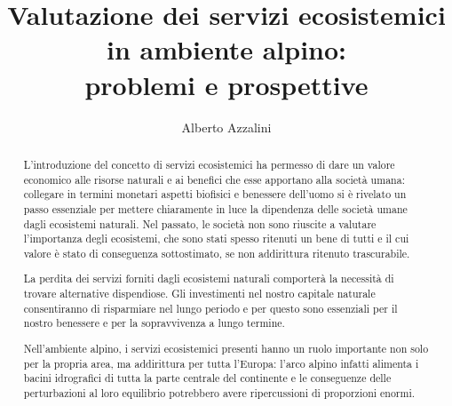 \documentclass[12pt,a4paper]{article}
\author{Alberto Azzalini}
\title{Valutazione dei servizi ecosistemici in ambiente alpino:\\ problemi e prospettive}
\begin{document}
	\maketitle
	\begin{abstract}
		L'introduzione del concetto di servizi ecosistemici \cite{MEA_EcosystemsAndHumanWellBeing:Synthesis} ha permesso di dare un valore economico alle risorse naturali e ai benefici che esse apportano alla società umana: collegare in termini monetari aspetti biofisici e benessere dell'uomo si è rivelato un passo essenziale per mettere chiaramente in luce la dipendenza delle società umane dagli ecosistemi naturali.
		Nel passato, le società non sono riuscite a valutare l'importanza degli ecosistemi, che sono stati spesso ritenuti un bene di tutti e il cui valore è stato di conseguenza sottostimato, se non addirittura ritenuto trascurabile.
		
		La perdita dei servizi forniti dagli ecosistemi naturali comporterà la necessità di trovare alternative dispendiose. Gli investimenti nel nostro capitale naturale consentiranno di risparmiare nel lungo periodo e per questo sono essenziali per il nostro benessere e per la sopravvivenza a lungo termine. \cite{Ecosystem_goods_and_services}
		
		Nell'ambiente alpino, i servizi ecosistemici presenti hanno un ruolo importante non solo per la propria area, ma addirittura per tutta l'Europa: l'arco alpino infatti alimenta i bacini idrografici di tutta la parte centrale del continente e le conseguenze delle perturbazioni al loro equilibrio potrebbero avere ripercussioni di proporzioni enormi.
		
		
	\end{abstract}
	
\end{document}
